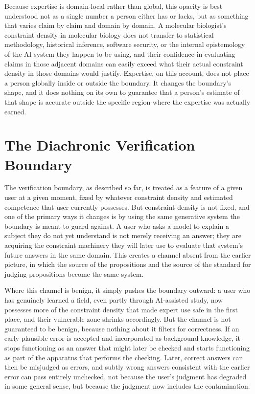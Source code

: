 \documentclass[11pt]{article}
\begin{document}
Because expertise is domain-local rather than global, this opacity is best understood not as a single number a person either has or lacks, but as something that varies claim by claim and domain by domain. A molecular biologist's constraint density in molecular biology does not transfer to statistical methodology, historical inference, software security, or the internal epistemology of the AI system they happen to be using, and their confidence in evaluating claims in those adjacent domains can easily exceed what their actual constraint density in those domains would justify. Expertise, on this account, does not place a person globally inside or outside the boundary. It changes the boundary's shape, and it does nothing on its own to guarantee that a person's estimate of that shape is accurate outside the specific region where the expertise was actually earned.

\section{The Diachronic Verification Boundary}

The verification boundary, as described so far, is treated as a feature of a given user at a given moment, fixed by whatever constraint density and estimated competence that user currently possesses. But constraint density is not fixed, and one of the primary ways it changes is by using the same generative system the boundary is meant to guard against. A user who asks a model to explain a subject they do not yet understand is not merely receiving an answer; they are acquiring the constraint machinery they will later use to evaluate that system's future answers in the same domain. This creates a channel absent from the earlier picture, in which the source of the propositions and the source of the standard for judging propositions become the same system.

Where this channel is benign, it simply pushes the boundary outward: a user who has genuinely learned a field, even partly through AI-assisted study, now possesses more of the constraint density that made expert use safe in the first place, and their vulnerable zone shrinks accordingly. But the channel is not guaranteed to be benign, because nothing about it filters for correctness. If an early plausible error is accepted and incorporated as background knowledge, it stops functioning as an answer that might later be checked and starts functioning as part of the apparatus that performs the checking. Later, correct answers can then be misjudged as errors, and subtly wrong answers consistent with the earlier error can pass entirely unchecked, not because the user's judgment has degraded in some general sense, but because the judgment now includes the contamination.
\end{document}
